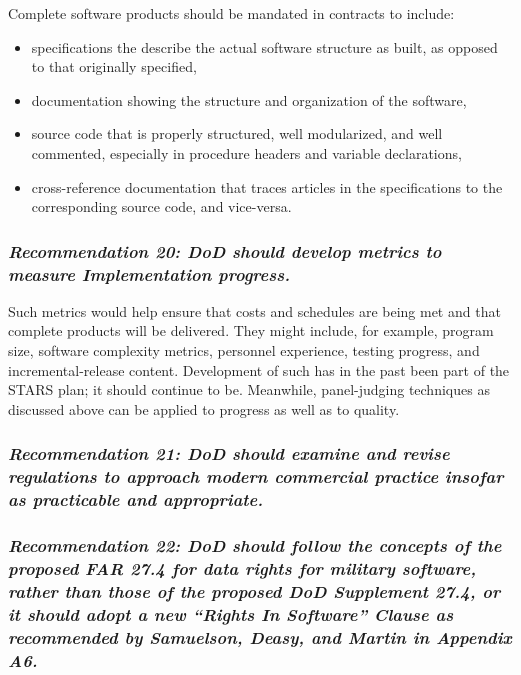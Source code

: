 \documentclass[12pt,final]{article}
\begin{document}
Complete software products should be mandated in contracts to include:

\begin{itemize}
    \item specifications the describe the actual software structure as built,
        as opposed to that originally specified,
    \item documentation showing the structure and organization of the software,
    \item source code that is properly structured, well modularized, and well
        commented, especially in procedure headers and variable declarations,
    \item cross-reference documentation that traces articles in the
        specifications to the corresponding source code, and vice-versa.
\end{itemize}

\subsubsection*{\textit{Recommendation 20: DoD should develop metrics to
measure Implementation progress.}}

Such metrics would help ensure that costs and schedules are being met and that
complete products will be delivered. They might include, for example, program
size, software complexity metrics, personnel experience, testing progress, and
incremental-release content. Development of such has in the past been part of
the STARS plan; it should continue to be. Meanwhile, panel-judging techniques
as discussed above can be applied to progress as well as to quality.

\subsubsection*{\textit{Recommendation 21: DoD should examine and revise
regulations to approach modern commercial practice insofar as practicable and
appropriate.}}

\subsubsection*{\textit{Recommendation 22: DoD should follow the concepts of
the proposed FAR 27.4 for data rights for military software, rather than those
of the proposed DoD Supplement 27.4, or it should adopt a new “Rights In
Software” Clause as recommended by Samuelson, Deasy, and Martin in Appendix
A6.}}
\end{document}
